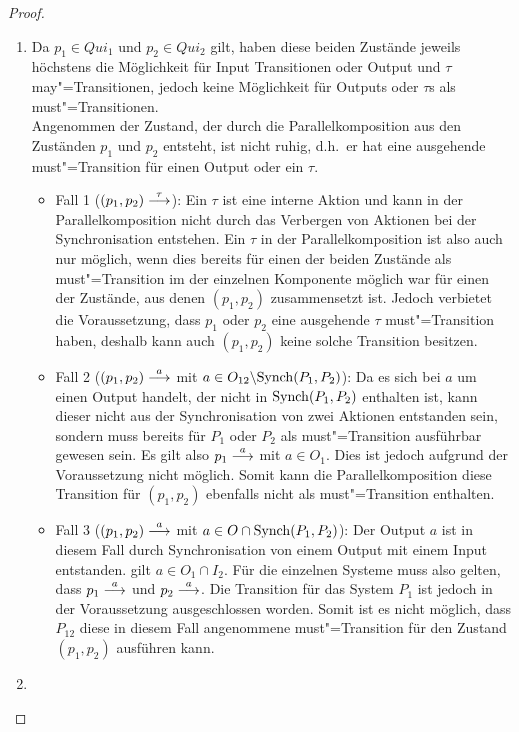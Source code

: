 \begin{proof}\mbox{}
  \begin{enumerate}
    \item Da $p_1\in Qui_1$ und $p_2\in Qui_2$ gilt, haben diese beiden
      Zustände jeweils höchstens die Möglichkeit für Input Transitionen oder
      Output und $\tau$ may"=Transitionen, jedoch keine Möglichkeit für Outputs
      oder $\tau$s als must"=Transitionen.\\
      Angenommen der Zustand, der durch die Parallelkomposition aus den
      Zuständen $p_1$ und $p_2$ entsteht, ist nicht ruhig, d.h.\ er hat eine
      ausgehende must"=Transition für einen Output oder ein $\tau$.
      \begin{itemize}
        \item Fall 1 \big($(p_1,p_2)\must[\tau]$\big): Ein $\tau$ ist eine interne
          Aktion und kann in der Parallelkomposition nicht durch das Verbergen
          von Aktionen bei der Synchronisation entstehen. Ein $\tau$ in der
          Parallelkomposition ist also auch nur möglich, wenn dies bereits für
          einen der beiden Zustände als must"=Transition im der einzelnen
          Komponente möglich war für einen der Zustände, aus denen $(p_1,p_2)$
          zusammensetzt ist. Jedoch verbietet die Voraussetzung, dass $p_1$
          oder $p_2$ eine ausgehende $\tau$ must"=Transition haben, deshalb
          kann auch $(p_1,p_2)$ keine solche Transition besitzen.
        \item Fall 2 \big($(p_1,p_2)\must[a]$ mit $a\in O_{12}\backslash
          \mathrm{Synch}(P_1,P_2)$\big): Da es sich bei $a$ um einen Output handelt, der
          nicht in $\mathrm{Synch} (P_1,P_2)$ enthalten ist, kann dieser nicht aus der
          Synchronisation von zwei Aktionen entstanden sein, sondern muss
          bereits für $P_1$ oder $P_2$ als must"=Transition ausführbar gewesen
          sein. Es gilt also \oBdA{} $p_1\must[a]$ mit $a\in O_1$. Dies ist
          jedoch aufgrund der Voraussetzung nicht möglich. Somit kann die
          Parallelkomposition diese Transition für $(p_1,p_2)$ ebenfalls nicht
          als must"=Transition enthalten.
        \item Fall 3 \big($(p_1,p_2)\must[a]$ mit $a\in O\cap\mathrm{Synch}
          (P_1,P_2)$\big): Der Output $a$ ist in diesem Fall durch
          Synchronisation von einem Output mit einem Input entstanden. \OBdA{}
          gilt $a\in O_1\cap I_2$. Für die einzelnen Systeme muss also gelten,
          dass $p_1\must[a]$ und $p_2\must[a]$. Die Transition für das System
          $P_1$ ist jedoch in der Voraussetzung ausgeschlossen worden. Somit
          ist es nicht möglich, dass $P_{12}$ diese in diesem Fall angenommene
          must"=Transition für den Zustand $(p_1,p_2)$ ausführen kann.
      \end{itemize}
    \item {}
  \end{enumerate}
\end{proof}

